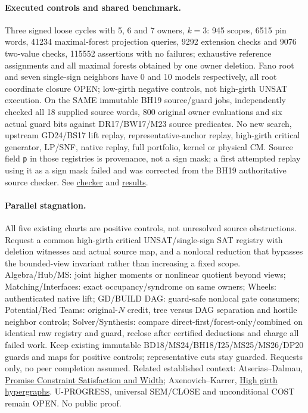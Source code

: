 \documentclass[11pt]{article}
\begin{document}
\paragraph{Executed controls and shared benchmark.}
Three signed loose cycles with 5, 6 and 7 owners, $k=3$: 945 scopes, 6515 pin words, 41234 maximal-forest projection queries, 9292 extension checks and 9076 two-value checks, 115552 assertions with no failures; exhaustive reference assignments and all maximal forests obtained by one owner deletion. Fano root and seven single-sign neighbors have 0 and 10 models respectively, all root coordinate closure OPEN; low-girth negative controls, not high-girth UNSAT execution. On the SAME immutable BH19 source/guard jobs, independently checked all 18 supplied source words, 800 original owner evaluations and six actual guard bits against DR17/BW17/M23 source predicates. No new search, upstream GD24/BS17 lift replay, representative-anchor replay, high-girth critical generator, LP/SNF, native replay, full portfolio, kernel or physical CM. Source field \texttt{p} in those registries is provenance, not a sign mask; a first attempted replay using it as a sign mask failed and was corrected from the BH19 authoritative source checker. See \href{https://github.com/j15marti/pnp/commit/4c9d2b1fb60160129eb68404fde503ad6ab836fd}{checker} and \href{https://github.com/j15marti/pnp/commit/bdbf7f65e3edcc253f1a8490eda0f439418f1cc9}{results}.

\paragraph{Parallel stagnation.}
All five existing charts are positive controls, not unresolved source obstructions. Request a common high-girth critical UNSAT/single-sign SAT registry with deletion witnesses and actual source map, and a nonlocal reduction that bypasses the bounded-view invariant rather than increasing a fixed scope. Algebra/Hub/MS: joint higher moments or nonlinear quotient beyond views; Matching/Interfaces: exact occupancy/syndrome on same owners; Wheels: authenticated native lift; GD/BUILD DAG: guard-safe nonlocal gate consumers; Potential/Red Teams: original-$N$ credit, tree versus DAG separation and hostile neighbor controls; Solver/Synthesis: compare direct-first/forest-only/combined on identical raw registry and guard, reclose after certified deductions and charge all failed work. Keep existing immutable BD18/MS24/BH18/I25/MS25/MS26/DP20 guards and maps for positive controls; representative cuts stay guarded. Requests only, no peer completion assumed. Related established context: Atserias--Dalmau, \href{https://doi.org/10.1137/1.9781611977073.48}{Promise Constraint Satisfaction and Width}; Axenovich--Karrer, \href{https://arxiv.org/abs/1607.06600}{High girth hypergraphs}. U-PROGRESS, universal SEM/CLOSE and unconditional COST remain OPEN. No public proof.
\end{document}
